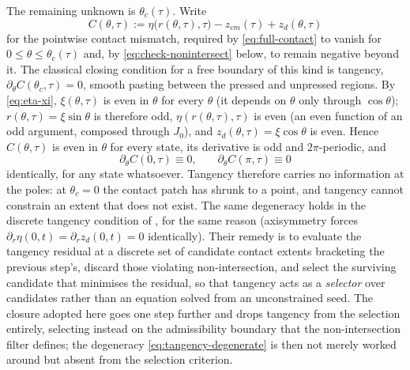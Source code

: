 The remaining unknown is $\theta_c(\tau)$. Write
\begin{equation}
    C(\theta,\tau) := \eta\big(r(\theta,\tau),\tau\big)-z_{cm}(\tau)+z_d(\theta,\tau)
    \label{eq:pointwise-residual}
\end{equation}
for the pointwise contact mismatch, required by \eqref{eq:full-contact} to vanish for $0\le\theta\le\theta_c(\tau)$ and, by \eqref{eq:check-nonintersect} below, to remain negative beyond it. The classical closing condition for a free boundary of this kind is tangency, $\partial_\theta C(\theta_c,\tau)=0$, smooth pasting between the pressed and unpressed regions. By \eqref{eq:eta-xi}, $\xi(\theta,\tau)$ is even in $\theta$ for every $\theta$ (it depends on $\theta$ only through $\cos\theta$); $r(\theta,\tau)=\xi\sin\theta$ is therefore odd, $\eta(r(\theta,\tau),\tau)$ is even (an even function of an odd argument, composed through $J_0$), and $z_d(\theta,\tau)=\xi\cos\theta$ is even. Hence $C(\theta,\tau)$ is even in $\theta$ for every state, its derivative is odd and $2\pi$-periodic, and
\begin{equation}
    \partial_\theta C(0,\tau)\equiv0\text{,}\qquad \partial_\theta C(\pi,\tau)\equiv0
    \label{eq:tangency-degenerate}
\end{equation}
identically, for any state whatsoever. Tangency therefore carries no information at the poles: at $\theta_c=0$ the contact patch has shrunk to a point, and tangency cannot constrain an extent that does not exist. The same degeneracy holds in the discrete tangency condition of \cite{AgueroEtAl2026}, for the same reason (axisymmetry forces $\partial_r\eta(0,t)=\partial_rz_d(0,t)=0$ identically). Their remedy is to evaluate the tangency residual at a discrete set of candidate contact extents bracketing the previous step's, discard those violating non-intersection, and select the surviving candidate that minimises the residual, so that tangency acts as a \emph{selector} over candidates rather than an equation solved from an unconstrained seed. The closure adopted here goes one step further and drops tangency from the selection entirely, selecting instead on the admissibility boundary that the non-intersection filter defines; the degeneracy \eqref{eq:tangency-degenerate} is then not merely worked around but absent from the selection criterion.

